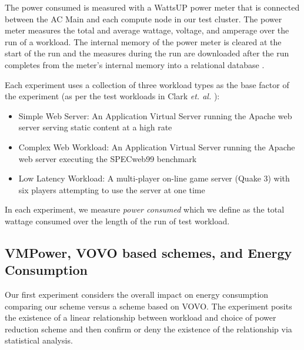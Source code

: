 \documentclass[times, 10pt,twocolumn]{article}
\begin{document}
The power consumed is measured with a WattsUP \cite{WattsUp2006a} power meter
that is connected between the AC Main and each compute node in our test
cluster.  The power meter measures the total and average wattage, voltage, and
amperage over the run of a workload.  The internal memory of the power meter
is cleared at the start of the run and the measures during the run are
downloaded after the run completes from the meter's internal memory into a
relational database \cite{WattsUp2006b}.

Each experiment uses a collection of three  workload types as the base factor of
the experiment (as per the test workloads in Clark \textit{et. al.}
\cite{Clark2005}):
\begin{itemize}
\item Simple Web Server: An Application Virtual Server running the Apache web
  server serving static content at a high rate
\item Complex Web Workload: An Application Virtual Server running the Apache
  web server executing the SPECweb99 benchmark
\item Low Latency Workload: A multi-player on-line game server (Quake 3)
  with six players attempting to use the server at one time
\end{itemize}

In each experiment, we measure \textit{power consumed} which we define as the
total wattage consumed over the length of the run of test workload.

\subsection{VMPower, VOVO based schemes, and Energy Consumption}
\label{sec:energy}
Our first experiment considers the overall impact on energy consumption
comparing our scheme versus a scheme based on VOVO.  The experiment posits the
existence of a linear relationship between workload and choice of power
reduction scheme and then confirm or deny the existence of the relationship
via statistical analysis.
\end{document}
